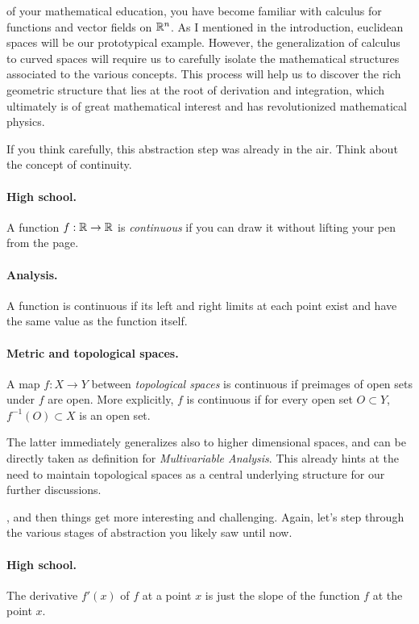  of your mathematical education, you have become familiar with calculus for functions and vector fields on $\mathbb{R}^n$.
As I mentioned in the introduction, euclidean spaces will be our prototypical example.
However, the generalization of calculus to curved spaces will require us to carefully isolate the mathematical structures associated to the various concepts.
This process will help us to discover the rich geometric structure that lies at the root of derivation and integration, which ultimately is of great mathematical interest and has revolutionized mathematical physics.

If you think carefully, this abstraction step was already in the air. Think about the concept of continuity.
\medskip

\paragraph{High school.} A function $f:\mathbb{R}\to\mathbb{R}$ is \emph{continuous} if you can draw it without lifting your pen from the page.

\paragraph{Analysis.} A function is continuous if its left and right limits at each point exist and have the same value as the function itself.

\paragraph{Metric and topological spaces.} A map $f:X\to Y$ between \emph{topological spaces} is continuous if preimages of open sets under $f$ are open. More explicitly, $f$ is continuous if for every open set $O\subset Y$, $f^{-1}(O)\subset X$ is an open set.
\medskip

The latter immediately generalizes also to higher dimensional spaces, and can be directly taken as definition for \emph{Multivariable Analysis}. This already hints at the need to maintain topological spaces as a central underlying structure for our further discussions.
\medskip

, and then things get more interesting and challenging. Again, let's step through the various stages of abstraction you likely saw until now.
\medskip

\paragraph{High school.} The derivative $f'(x)$ of $f$ at a point $x$ is just the slope of the function $f$ at the point $x$.

